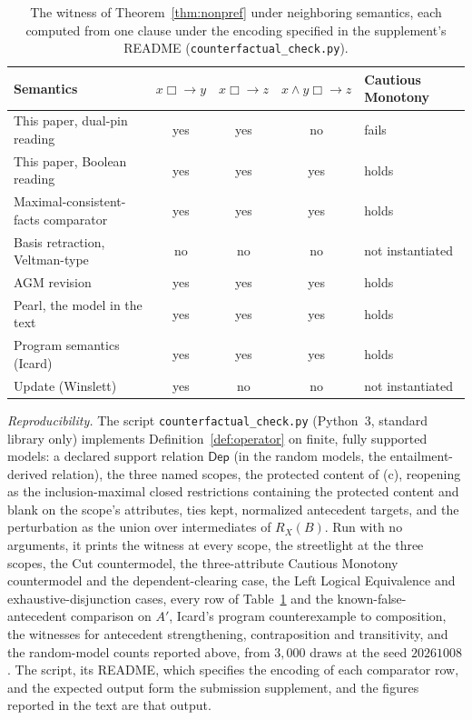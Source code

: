 \begin{table}[ht]
\centering
\small
\caption{The witness of Theorem~\ref{thm:nonpref} under neighboring semantics, each computed from one clause under the encoding specified in the supplement's README (\texttt{counterfactual\_check.py}).}
\label{tab:competitors}
\begin{tabular}{@{}lcccl@{}}
\toprule
Semantics & $x \mathrel{\Box\!\!\rightarrow} y$ & $x \mathrel{\Box\!\!\rightarrow} z$ & $x \wedge y \mathrel{\Box\!\!\rightarrow} z$ & Cautious Monotony \\
\midrule
This paper, dual-pin reading & yes & yes & no & fails \\
This paper, Boolean reading & yes & yes & yes & holds \\
Maximal-consistent-facts comparator & yes & yes & yes & holds \\ Basis retraction, Veltman-type & no & no & no & not instantiated \\
AGM revision & yes & yes & yes & holds \\
Pearl, the model in the text & yes & yes & yes & holds \\
Program semantics (Icard) & yes & yes & yes & holds \\
Update (Winslett) & yes & no & no & not instantiated \\
\bottomrule
\end{tabular}
\end{table}

\noindent\textit{Reproducibility.} The script \texttt{counterfactual\_check.py} (Python~3, standard library only) implements Definition~\ref{def:operator} on finite, fully supported models: a declared support relation $\mathsf{Dep}$ (in the random models, the entailment-derived relation), the three named scopes, the protected content of (c), reopening as the inclusion-maximal closed restrictions containing the protected content and blank on the scope's attributes, ties kept, normalized antecedent targets, and the perturbation as the union over intermediates of $R_X(B)$. Run with no arguments, it prints the witness at every scope, the streetlight at the three scopes, the Cut countermodel, the three-attribute Cautious Monotony countermodel and the dependent-clearing case, the Left Logical Equivalence and exhaustive-disjunction cases, every row of Table~\ref{tab:competitors} and the known-false-antecedent comparison on $A'$, Icard's program counterexample to composition, the witnesses for antecedent strengthening, contraposition and transitivity, and the random-model counts reported above, from $3{,}000$ draws at the seed $20261008$. The script, its README, which specifies the encoding of each comparator row, and the expected output form the submission supplement, and the figures reported in the text are that output.

